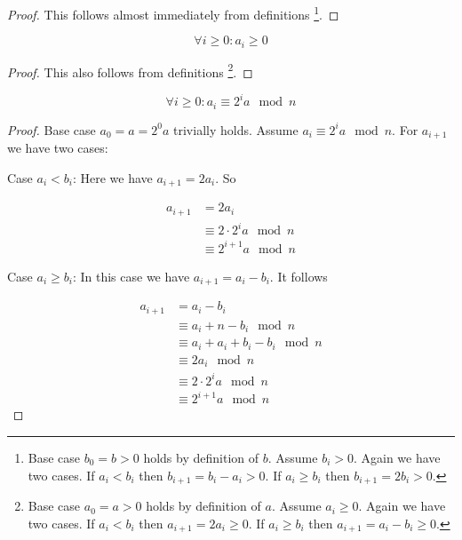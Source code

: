 \begin{proof}
This follows almost immediately from definitions \footnote{
Base case $b_0 = b > 0$ holds by definition of $b$. Assume $b_i > 0$. Again we have two cases. If $a_i < b_i$ then $b_{i+1} = b_i - a_i > 0$. 
If $a_i \geq b_i$ then $b_{i+1} = 2 b_i > 0$.
}.

\end{proof}

\begin{thminv}\label{p3}
$$
  \forall i \geq 0: a_i \geq 0
$$
\end{thminv}

\begin{proof}
This also follows from definitions \footnote{
Base case $a_0 = a > 0$ holds by definition of $a$. Assume $a_i \geq 0$. Again we have two cases. If $a_i < b_i$ then $a_{i+1} = 2 a_i \geq 0$. 
If $a_i \geq b_i$ then $a_{i+1} = a_i - b_i \geq 0$.
}.

\end{proof}


\begin{thminv}\label{p4}
$$
  \forall i \geq 0: a_i \equiv 2^i a \mod n
$$
\end{thminv}

\begin{proof}
Base case $a_0 = a = 2^0 a$ trivially holds.
Assume $a_i \equiv 2^i a \mod n$. For $a_{i+1}$ we have two cases:

Case $a_i < b_i$: Here we have $a_{i+1} = 2 a_i$. So

\begin{align*}
  a_{i+1} &= 2 a_i \\
  &\equiv 2 \cdot 2^i a \mod n \\
  &\equiv 2^{i+1} a \mod n
\end{align*}

Case $a_i \geq b_i$: In this case we have  $a_{i+1} = a_i - b_i$. It follows

\begin{align*}
  a_{i+1} &= a_i - b_i \\
  &\equiv a_i + n - b_i \mod n \\
  &\equiv a_i + a_i + b_i - b_i \mod n \\
  &\equiv 2 a_i \mod n \\
  &\equiv 2 \cdot 2^i a \mod n \\
  &\equiv 2^{i+1} a \mod n  
\end{align*}

\end{proof}

